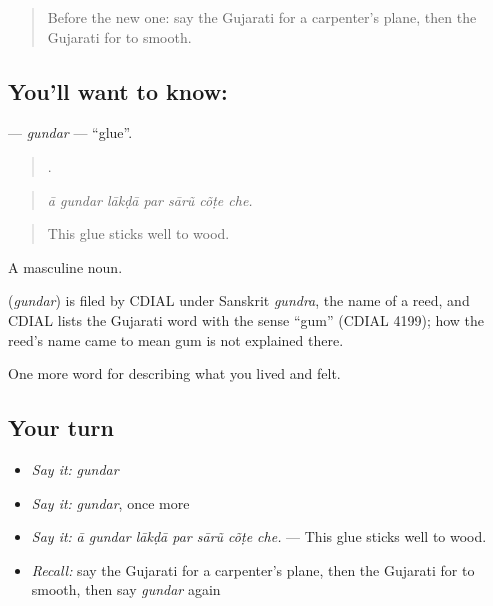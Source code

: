 \label{lesson:GU-C503-gundar}



\begin{quote}
Before the new one: say the Gujarati for a carpenter's plane, then the Gujarati for to smooth.
\end{quote}

\subsection*{You'll want to know: }
\textbf{} — \emph{gundar} — \textquotedblleft{}glue\textquotedblright{}.

\begin{quote}
      .
\end{quote}

\begin{quote}
\emph{ā gundar lākḍā par sārũ cõṭe che.}
\end{quote}

\begin{quote}
This glue sticks well to wood.
\end{quote}

A masculine noun.

\begin{cousinweb}
\textbf{} (\emph{gundar}) is filed by CDIAL under Sanskrit \emph{gundra}, the name of a reed, and CDIAL lists the Gujarati word with the sense \textquotedblleft{}gum\textquotedblright{} (CDIAL 4199); how the reed's name came to mean gum is not explained there.
\end{cousinweb}

\begin{grammarlens}[title={What you've built}]
One more word for describing what you lived and felt.
\end{grammarlens}

\subsection*{Your turn}
\begin{itemize}
\raggedright
  \item \emph{Say it:} \emph{gundar}
  \item \emph{Say it:} \emph{gundar}, once more
  \item \emph{Say it:} \emph{ā gundar lākḍā par sārũ cõṭe che.} — This glue sticks well to wood.
  \item \emph{Recall:} say the Gujarati for a carpenter's plane, then the Gujarati for to smooth, then say \emph{gundar} again
\end{itemize}

